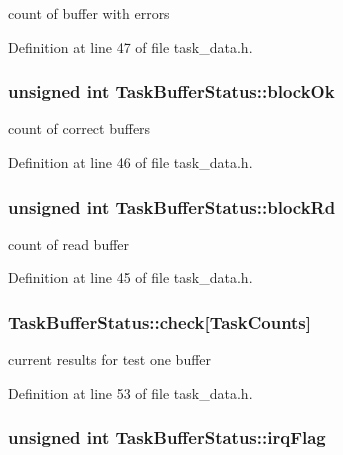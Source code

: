 count of buffer with errors 

Definition at line 47 of file task\_\-data.h.\hypertarget{structTaskBufferStatus_aabc9f698de646935e330356dab0736c9}{
\subsubsection[{blockOk}]{\setlength{\rightskip}{0pt plus 5cm}unsigned int {\bf TaskBufferStatus::blockOk}}}
\label{structTaskBufferStatus_aabc9f698de646935e330356dab0736c9}


count of correct buffers 

Definition at line 46 of file task\_\-data.h.\hypertarget{structTaskBufferStatus_aa37878c4c19f5cfd5bbb010c3377bd94}{
\subsubsection[{blockRd}]{\setlength{\rightskip}{0pt plus 5cm}unsigned int {\bf TaskBufferStatus::blockRd}}}
\label{structTaskBufferStatus_aa37878c4c19f5cfd5bbb010c3377bd94}


count of read buffer 

Definition at line 45 of file task\_\-data.h.\hypertarget{structTaskBufferStatus_ab95fe846215632d00858e3ed0fa4a293}{
\subsubsection[{check}]{ {\bf TaskBufferStatus::check}\mbox{[}{\bf TaskCounts}\mbox{]}}}
\label{structTaskBufferStatus_ab95fe846215632d00858e3ed0fa4a293}


current results for test one buffer 

Definition at line 53 of file task\_\-data.h.\hypertarget{structTaskBufferStatus_ad2f11a4542658ad3fdec4eac2bcf8eeb}{
\subsubsection[{irqFlag}]{\setlength{\rightskip}{0pt plus 5cm}unsigned int {\bf TaskBufferStatus::irqFlag}}}
\label{structTaskBufferStatus_ad2f11a4542658ad3fdec4eac2bcf8eeb}


